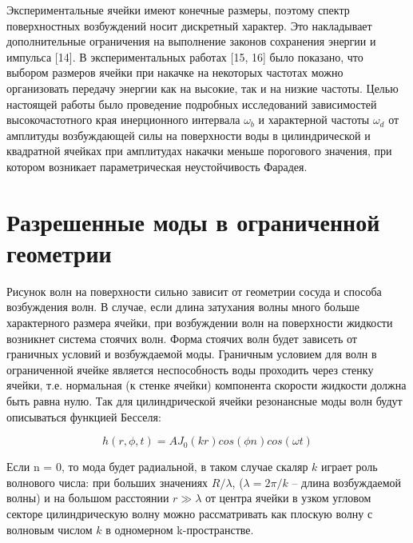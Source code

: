 
Экспериментальные ячейки имеют конечные размеры, поэтому спектр поверхностных возбуждений носит дискретный характер. Это накладывает дополнительные ограничения на выполнение законов сохранения энергии и импульса [14]. В экспериментальных работах [15, 16] было показано, что выбором размеров ячейки при накачке на некоторых частотах можно организовать передачу энергии как на высокие, так и на низкие частоты.
Целью настоящей работы было проведение подробных исследований зависимостей высокочастотного края инерционного интервала $\omega_b$ и характерной частоты $\omega_d$ от амплитуды возбуждающей силы на поверхности воды в цилиндрической и квадратной ячейках при амплитудах накачки меньше порогового значения, при котором возникает параметрическая неустойчивость Фарадея.

\section{Разрешенные моды в ограниченной геометрии} %
Рисунок волн на поверхности сильно зависит от геометрии сосуда и способа возбуждения волн.
В случае, если длина затухания волны много больше характерного размера ячейки, при возбуждении волн на поверхности жидкости возникнет система стоячих волн. Форма стоячих волн будет зависеть от граничных условий и возбуждаемой моды. Граничным условием для волн в ограниченной ячейке является неспособность воды проходить через стенку ячейки, т.е. нормальная (к стенке ячейки) компонента скорости жидкости должна быть равна нулю. Так для цилиндрической ячейки резонансные моды волн будут описываться функцией Бесселя:

\begin{equation}
 \label{eq:Bessel}
h(r, \phi, t) = A J_0(kr) cos(\phi n) cos(\omega t)
\end{equation}

Если n = 0, то мода будет радиальной, в таком случае скаляр $k$ играет роль волнового числа: при больших значениях $R/\lambda$, ($\lambda = 2\pi/k$ – длина возбуждаемой волны) и на большом расстоянии $r \gg \lambda$ от центра ячейки в узком угловом секторе цилиндрическую волну можно рассматривать как плоскую волну с волновым числом $k$ в одномерном k-пространстве.

